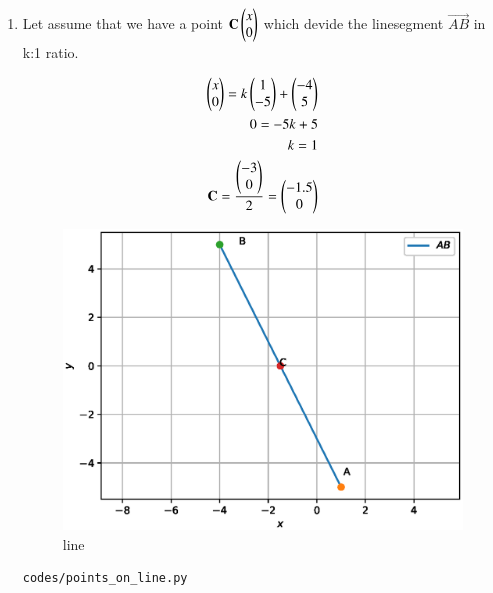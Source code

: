 \renewcommand{\theequation}{\theenumi}
\begin{enumerate}[label=\arabic*.,ref=\thesubsection.\theenumi]

\item 
Let assume that we have a point $\mathbf{C}\begin{pmatrix}x\\0\end{pmatrix}$ which devide the linesegment $\vec{AB} $ in k:1 ratio.

\begin{align}
\begin{pmatrix}x\\0\end{pmatrix} =k\begin{pmatrix}1\\-5\end{pmatrix} + \begin{pmatrix}-4\\5\end{pmatrix}
\\
0 = -5k + 5
\\
k= 1
\\
\mathbf{C} = \frac{\begin{pmatrix}-3\\0\end{pmatrix}}{2} = \begin{pmatrix}-1.5\\0\end{pmatrix}
\end{align}
\begin{figure}[!ht]
	\centering
	\includegraphics[width=\columnwidth]{./figures/point_on_line.eps}
	\caption{line }
	\label{fig:line}
\end{figure}
\begin{lstlisting}
codes/points_on_line.py
\end{lstlisting}

\end{enumerate}